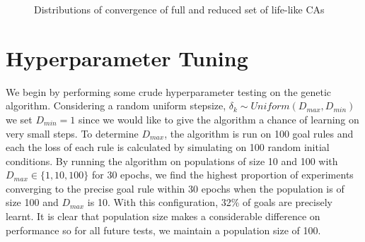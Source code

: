 \begin{figure}[!h]
\centering
            \hfill
            \hfill
            \caption{Distributions of convergence of full and reduced set of life-like CAs}
\label{fig:taxonomy-dist}
\end{figure}

\section{Hyperparameter Tuning}

We begin by performing some crude hyperparameter testing on the genetic algorithm. Considering a random uniform stepsize, $\delta_k \sim \mathit{Uniform}(D_{max}, D_{min})$ we set $D_{min} = 1$ since we would like to give the algorithm a chance of learning on very small steps. To determine $D_{max}$, the algorithm is run on 100 goal rules and each the loss of each rule is calculated by simulating on 100 random initial conditions. By running the algorithm on populations of size 10 and 100 with $D_{max} \in \{1, 10, 100\}$ for 30 epochs, we find the highest proportion of experiments converging to the precise goal rule within 30 epochs when the population is of size 100 and $D_{max}$ is 10. With this configuration, 32\% of goals are precisely learnt. It is clear that population size makes a considerable difference on performance so for all future tests, we maintain a population size of 100.

